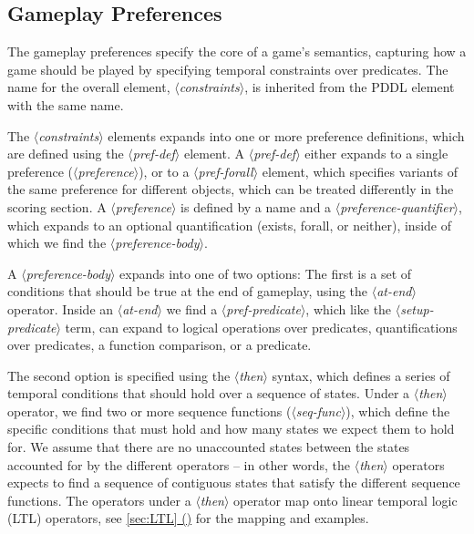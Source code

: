 \documentclass{article}
\newcommand{\dsl}[1]{{\it $\langle$#1$\rangle$}}
\newcommand*{\fullref}[1]{\hyperref[{#1}]{\autoref*{#1} (\nameref*{#1})}} %
\begin{document}
\subsection{Gameplay Preferences} \label{sec:constraints}
The gameplay preferences specify the core of a game's semantics, capturing how a game should be played by specifying temporal constraints over predicates. 
The name for the overall element, \dsl{constraints}, is inherited from the PDDL element with the same name. 

The \dsl{constraints} elements expands into one or more preference definitions, which are defined using the \dsl{pref-def} element. 
A \dsl{pref-def} either expands to a single preference (\dsl{preference}), or to a \dsl{pref-forall} element, which specifies variants of the same preference for different objects, which can be treated differently in the scoring section. 
A \dsl{preference} is defined by a name and a \dsl{preference-quantifier}, which expands to an optional quantification (exists, forall, or neither), inside of which we find the \dsl{preference-body}.

A \dsl{preference-body} expands into one of two options:
The first is a set of conditions that should be true at the end of gameplay, using the \dsl{at-end} operator. 
Inside an \dsl{at-end} we find a \dsl{pref-predicate}, which like the \dsl{setup-predicate} term, can expand to logical operations over predicates, quantifications over predicates, a function comparison, or a predicate.

The second option is specified using the \dsl{then} syntax, which defines a series of temporal conditions that should hold over a sequence of states. 
Under a \dsl{then} operator, we find two or more sequence functions (\dsl{seq-func}), which define the specific conditions that must hold and how many states we expect them to hold for. 
We assume that there are no unaccounted states between the states accounted for by the different operators -- in other words, the \dsl{then} operators expects to find a sequence of contiguous states that satisfy the different sequence functions. 
The operators under a \dsl{then} operator map onto linear temporal logic (LTL) operators, see \fullref{sec:LTL} for the mapping and examples. 
\end{document}
